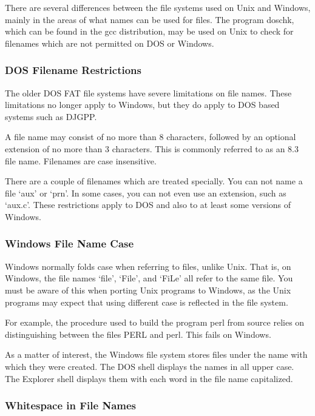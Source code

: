 There are several differences between the file systems used on Unix and Windows, mainly in the areas of what names can be used for files. The program doschk, which can be found in the gcc distribution, may be used on Unix to check for filenames which are not permitted on DOS or Windows. 


\subsubsection{DOS Filename Restrictions}

The older DOS FAT file systems have severe limitations on file names. These limitations no longer apply to Windows, but they do apply to DOS based systems such as DJGPP.

A file name may consist of no more than 8 characters, followed by an optional extension of no more than 3 characters. This is commonly referred to as an 8.3 file name. Filenames are case insensitive.

There are a couple of filenames which are treated specially. You can not name a file `aux' or `prn'. In some cases, you can not even use an extension, such as `aux.c'. These restrictions apply to DOS and also to at least some versions of Windows. 


\subsubsection{Windows File Name Case}

Windows normally folds case when referring to files, unlike Unix. That is, on Windows, the file names `file', `File', and `FiLe' all refer to the same file. You must be aware of this when porting Unix programs to Windows, as the Unix programs may expect that using different case is reflected in the file system.

For example, the procedure used to build the program perl from source relies on distinguishing between the files PERL and perl. This fails on Windows.

As a matter of interest, the Windows file system stores files under the name with which they were created. The DOS shell displays the names in all upper case. The Explorer shell displays them with each word in the file name capitalized. 

\subsubsection{Whitespace in File Names}

